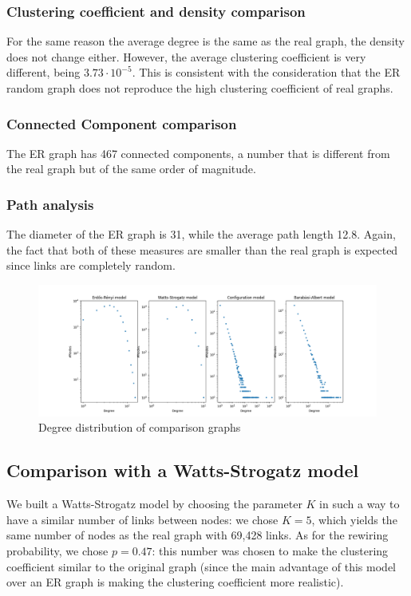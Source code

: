 \documentclass[sigchi]{acmart}
\begin{document}
\subsubsection{Clustering coefficient and density comparison}
For the same reason the average degree is the same as the real graph, the density does not change either. However, the average clustering coefficient is very different, being $3.73\cdot 10^{-5}$. This is consistent with the consideration that the ER random graph does not reproduce the high clustering coefficient of real graphs.
\subsubsection{Connected Component comparison}
The ER graph has 467 connected components, a number that is different from the real graph but of the same order of magnitude.
\subsubsection{Path analysis}
The diameter of the ER graph is 31, while the average path length 12.8. Again, the fact that both of these measures are smaller than the real graph is expected since links are completely random.

\begin{figure}[!htbp]
    \centering
    \includegraphics[width=\textwidth]{img/comparisonDegreeDist.png}
    \caption{Degree distribution of comparison graphs}
    \label{fig:my_label}
\end{figure}

\subsection{Comparison with a Watts-Strogatz model}
We built a Watts-Strogatz\cite{wattsstrogatz} model by choosing the parameter $K$ in such a way to have a similar number of links between nodes: we chose $K=5$, which yields the same number of nodes as the real graph with 69,428 links. As for the rewiring probability, we chose $p=0.47$: this number was chosen to make the clustering coefficient similar to the original graph (since the main advantage of this model over an ER graph is making the clustering coefficient more realistic).
\end{document}
